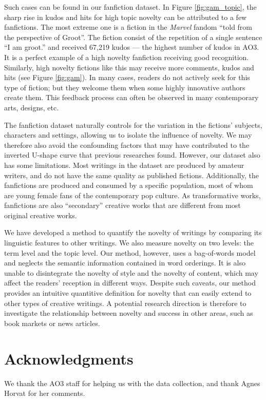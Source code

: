 \documentclass[letterpaper]{article} %
\begin{document}
Such cases can be found in our fanfiction dataset. In Figure \ref{fig:gam_topic}, the sharp rise in kudos and hits for high topic novelty can be attributed to a few fanfictions. The most extreme one is a fiction in the \emph{Marvel} fandom ``told from the perspective of Groot''. The fiction consist of the repetition of a single sentence ``I am groot.'' and received 67,219 kudos --- the highest number of kudos in AO3. It is a perfect example of a high novelty fanfiction receiving good recognition. Similarly, high novelty fictions like this may receive more comments, kudos and hits (see Figure \ref{fig:gam}). In many cases, readers do not actively seek for this type of fiction; but they welcome them when some highly innovative authors create them. This feedback process can often be observed in many contemporary arts, designs, etc.

The fanfiction dataset naturally controls for the variation in the fictions' subjects, characters and settings, allowing us to isolate the influence of novelty. We may therefore also avoid the confounding factors that may have contributed to the inverted U-shape curve that previous researches found. However, our dataset also has some limitations. Most writings in the dataset are produced by amateur writers, and do not have the same quality as published fictions. Additionally, the fanfictions are produced and consumed by a specific population, most of whom are young female fans of the contemporary pop culture. As transformative works, fanfictions are also ``secondary'' creative works that are different from most original creative works. 

We have developed a method to quantify the novelty of writings by comparing its linguistic features to other writings. We also measure novelty on two levels: the term level and the topic level. Our method, however, uses a bag-of-words model and neglects the semantic information contained in word orderings. It is also unable to disintegrate the novelty of style and the novelty of content, which may affect the readers' reception in different ways. Despite such caveats, our method provides an intuitive quantitive definition for novelty that can easily extend to other types of creative writings. A potential research direction is therefore to investigate the relationship between novelty and success in other areas, such as book markets or news articles.






\section{ Acknowledgments}
We thank the AO3 staff for helping us with the data collection, and thank Agnes Horvat for her comments.



\end{document}
